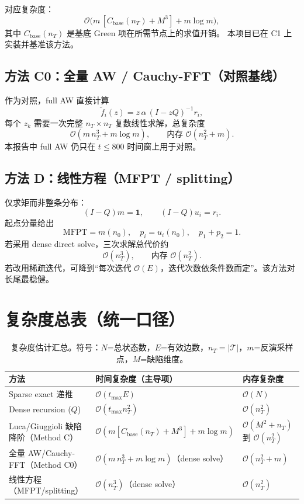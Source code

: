 \documentclass[11pt,a4paper]{ctexart}
\begin{document}
对应复杂度：
\[
\mathcal O\!\big(m\,[C_{\text{base}}(n_T)+M^3]+m\log m\big),
\]
其中 $C_{\text{base}}(n_T)$ 是基底 Green 项在所需节点上的求值开销。
本项目已在 C1 上实装并基准该方法。

\subsection{方法 C0：全量 AW / Cauchy-FFT（对照基线）}
作为对照，full AW 直接计算
\[
\tilde f_i(z)=z\,\alpha\,(I-zQ)^{-1}r_i,
\]
每个 $z_k$ 需要一次完整 $n_T\times n_T$ 复数线性求解，总复杂度
\[
\mathcal O(m\,n_T^3 + m\log m),\qquad \text{内存 } \mathcal O(n_T^2+m).
\]
本报告中 full AW 仍只在 $t\le 800$ 时间窗上用于对照。

\subsection{方法 D：线性方程（MFPT / splitting）}
仅求矩而非整条分布：
\[
(I-Q)m=\mathbf 1,\qquad (I-Q)u_i=r_i.
\]
起点分量给出
\[
\mathrm{MFPT}=m(n_0),\quad p_i=u_i(n_0),\quad p_1+p_2=1.
\]
若采用 dense direct solve，三次求解总代价约
\[
\mathcal O(n_T^3),\qquad \text{内存 } \mathcal O(n_T^2).
\]
若改用稀疏迭代，可降到“每次迭代 $\mathcal O(E)$，迭代次数依条件数而定”。该方法对长尾最稳健。

\section{复杂度总表（统一口径）}
\begin{table}[H]
  \centering
  \small
  \begin{tabular}{>{\raggedright\arraybackslash}p{3.1cm}>{\raggedright\arraybackslash}p{5.3cm}>{\raggedright\arraybackslash}p{3.8cm}}
    \toprule
    方法 & 时间复杂度（主导项） & 内存复杂度 \\
    \midrule
    Sparse exact 递推 & $\mathcal O(t_{\max}E)$ & $\mathcal O(N)$ \\
    Dense recursion ($Q$) & $\mathcal O(t_{\max}n_T^2)$ & $\mathcal O(n_T^2)$ \\
    Luca/Giuggioli 缺陷降阶（Method C） & $\mathcal O(m[C_{\text{base}}(n_T)+M^3]+m\log m)$ & $\mathcal O(M^2+n_T)$ 到 $\mathcal O(n_T^2)$ \\
    全量 AW/Cauchy-FFT（Method C0） & $\mathcal O(m\,n_T^3+m\log m)$（dense solve） & $\mathcal O(n_T^2+m)$ \\
    线性方程（MFPT/splitting） & $\mathcal O(n_T^3)$（dense solve） & $\mathcal O(n_T^2)$ \\
    \bottomrule
  \end{tabular}
  \caption{复杂度估计汇总。符号：$N$=总状态数，$E$=有效边数，$n_T=|\mathcal T|$，$m$=反演采样点，$M$=缺陷维度。}
\end{table}
\end{document}
